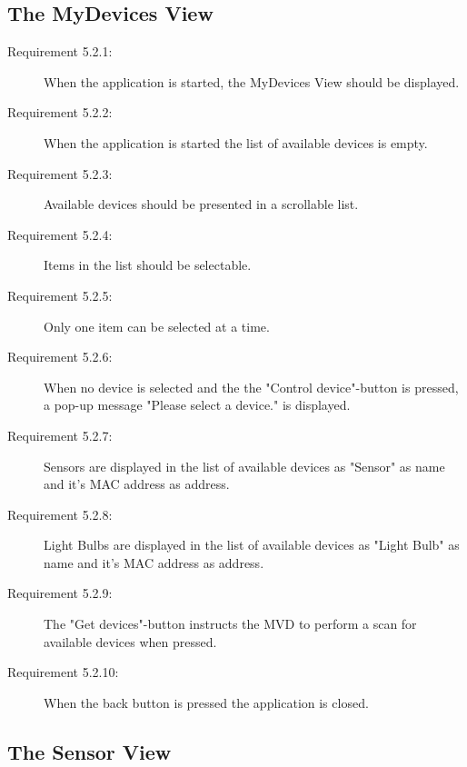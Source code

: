 \documentclass[a4paper]{article}
\begin{document}
\subsection{The MyDevices View}
\begin{description}
\item[Requirement 5.2.1:] When the application is started, the MyDevices View should be displayed.

\item[Requirement 5.2.2:] When the application is started the list of available devices is empty.

\item[Requirement 5.2.3:] Available devices should be presented in a scrollable list.

\item[Requirement 5.2.4:] Items in the list should be selectable.

\item[Requirement 5.2.5:] Only one item can be selected at a time.

\item[Requirement 5.2.6:] When no device is selected and the the "Control device"-button is pressed, a pop-up message "Please select a device." is displayed.

\item[Requirement 5.2.7:] Sensors are displayed in the list of available devices as "Sensor" as name and it's MAC address as address. 

\item[Requirement 5.2.8:] Light Bulbs are displayed in the list of available devices as "Light Bulb" as name and it's MAC address as address. 

\item[Requirement 5.2.9:] The "Get devices"-button instructs the MVD to perform a scan for available devices when pressed.

\item[Requirement 5.2.10:] When the back button is pressed the application is closed.

\end{description}

\subsection{The Sensor View}
\end{document}
